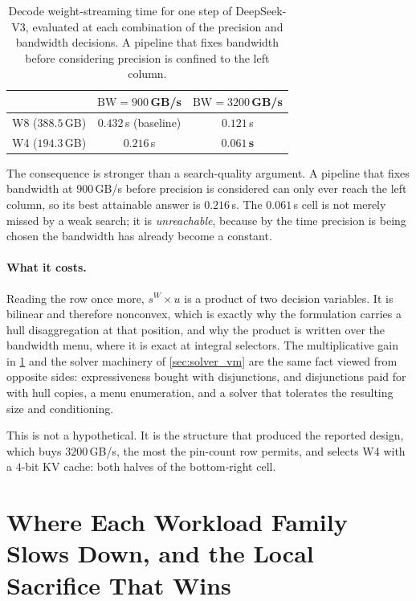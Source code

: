 \begin{table}[h]
\centering
\footnotesize
\caption{Decode weight-streaming time for one step of DeepSeek-V3, evaluated at
each combination of the precision and bandwidth decisions. A pipeline that fixes
bandwidth before considering precision is confined to the left column.}
\label{tab:worked_example}
\begin{tabular}{@{}lcc@{}}
\toprule
 & $\mathrm{BW} = 900$\,GB/s & $\mathrm{BW} = 3200$\,GB/s \\
\midrule
W8 \quad($388.5$\,GB) & $0.432$\,s \quad (baseline) & $0.121$\,s \\
W4 \quad($194.3$\,GB) & $0.216$\,s & $\mathbf{0.061}$\,\textbf{s} \\
\bottomrule
\end{tabular}
\end{table}

The consequence is stronger than a search-quality argument. A pipeline that fixes
bandwidth at $900$\,GB/s before precision is considered can only ever reach the
left column, so its best attainable answer is $0.216$\,s. The $0.061$\,s cell is
not merely missed by a weak search; it is \emph{unreachable}, because by the time
precision is being chosen the bandwidth has already become a constant.

\paragraph{What it costs.}
Reading the row once more, $s^W \times u$ is a product of two decision variables.
It is bilinear and therefore nonconvex, which is exactly why the formulation
carries a hull disaggregation at that position, and why the product is written
over the bandwidth menu, where it is exact at integral selectors. The
multiplicative gain in \cref{tab:worked_example} and the solver machinery of
\cref{sec:solver_vm} are the same fact viewed from opposite sides:
expressiveness bought with disjunctions, and disjunctions paid for with hull
copies, a menu enumeration, and a solver that tolerates the resulting size and
conditioning.

This is not a hypothetical. It is the structure that produced the reported
design, which buys $3200$\,GB/s, the most the pin-count row permits, and selects
W4 with a $4$-bit KV cache: both halves of the bottom-right cell.

\section{Where Each Workload Family Slows Down, and the Local Sacrifice That Wins}
\label{app:family_bottlenecks}

